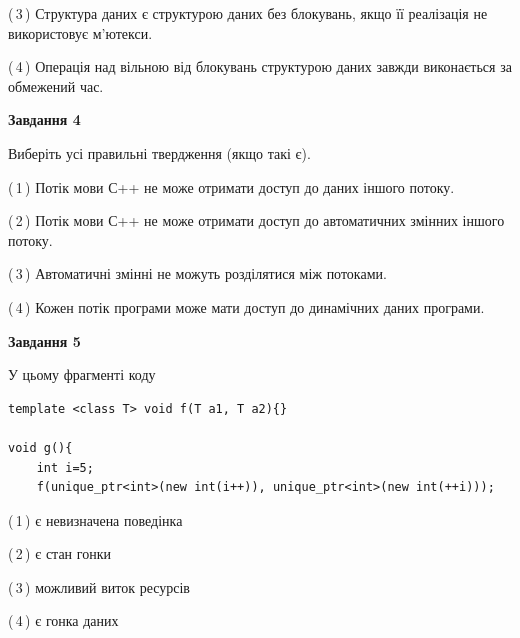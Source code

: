 \documentclass[12pt, ukrainian]{article}
\begin{document}
\begin {large}
{(\,3\,) Структура даних є структурою даних без блокувань, якщо її реалізація не використовує м’ютекси.%

(\,4\,) Операція над вільною від блокувань структурою даних завжди виконається за обмежений час.%



\begin{center}
\textbf{Завдання 4}
\end{center}
Виберіть усі правильні твердження (якщо такі є).\par
\vspace{2mm}

(\,1\,) Потік мови С++ не може отримати доступ до даних іншого потоку.%

(\,2\,) Потік мови С++ не може отримати доступ до автоматичних змінних іншого потоку.%

(\,3\,) Автоматичні змінні не можуть розділятися між потоками.%

(\,4\,) Кожен потік програми може мати доступ до динамічних даних програми.%



\begin{center}
\textbf{Завдання 5}
\end{center}
У цьому фрагменті коду
\begin{verbatim}
template <class T> void f(T a1, T a2){}

void g(){
    int i=5;
    f(unique_ptr<int>(new int(i++)), unique_ptr<int>(new int(++i)));
\end{verbatim}

(\,1\,) є невизначена поведінка%

(\,2\,) є стан гонки%

(\,3\,) можливий виток ресурсів%

(\,4\,) є гонка даних%


}
\end {large}
\end{document}
